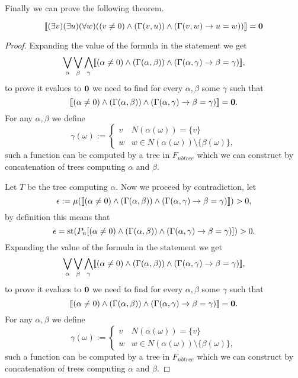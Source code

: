 Finally we can prove the following theorem.

\begin{thrm}
\[\llbracket(\exists v)(\exists u)(\forall w)((v\not=0)\land (\Gamma(v,u)) \land(\Gamma(v,w) \to u=w))\rrbracket=\textbf{0}\]
\end{thrm}
\begin{proof}
Expanding the value of the formula in the statement we get
\[\bigvee_{\alpha}\bigvee_{\beta}\bigwedge_{\gamma}\llbracket(\alpha\not=0)\land (\Gamma(\alpha,\beta)) \land(\Gamma(\alpha,\gamma) \to \beta=\gamma)\rrbracket,\]
to prove it evalues to $\textbf{0}$ we need to find for every $\alpha,\beta$ some $\gamma$ such that
\[\llbracket(\alpha\not=0)\land (\Gamma(\alpha,\beta)) \land(\Gamma(\alpha,\gamma) \to \beta=\gamma)\rrbracket=\textbf{0}.\]
For any $\alpha,\beta$ we define
\[\gamma(\omega):=\begin{cases}v&N(\alpha(\omega))=\{v\}\\w&w\in N(\alpha(\omega))\setminus\{\beta(\omega)\},\end{cases}\]
such a function can be computed by a tree in $F_{nbtree}$ which we can construct by concatenation of trees computing $\alpha$ and $\beta$.

Let $T$ be the tree computing $\alpha$. Now we proceed by contradiction, let
\[\epsilon:=\mu(\llbracket(\alpha\not=0)\land (\Gamma(\alpha,\beta)) \land(\Gamma(\alpha,\gamma) \to \beta=\gamma)\rrbracket)>0,\]
by definition this means that
\[\epsilon=\text{st}(P_n[(\alpha\not=0)\land (\Gamma(\alpha,\beta)) \land(\Gamma(\alpha,\gamma) \to \beta=\gamma)])>0.\]
Expanding the value of the formula in the statement we get
\[\bigvee_{\alpha}\bigvee_{\beta}\bigwedge_{\gamma}\llbracket(\alpha\not=0)\land (\Gamma(\alpha,\beta)) \land(\Gamma(\alpha,\gamma) \to \beta=\gamma)\rrbracket,\]
to prove it evalues to $\textbf{0}$ we need to find for every $\alpha,\beta$ some $\gamma$ such that
\[\llbracket(\alpha\not=0)\land (\Gamma(\alpha,\beta)) \land(\Gamma(\alpha,\gamma) \to \beta=\gamma)\rrbracket=\textbf{0}.\]
For any $\alpha,\beta$ we define
\[\gamma(\omega):=\begin{cases}v&N(\alpha(\omega))=\{v\}\\w&w\in N(\alpha(\omega))\setminus\{\beta(\omega)\},\end{cases}\]
such a function can be computed by a tree in $F_{nbtree}$ which we can construct by concatenation of trees computing $\alpha$ and $\beta$.


\end{proof}
